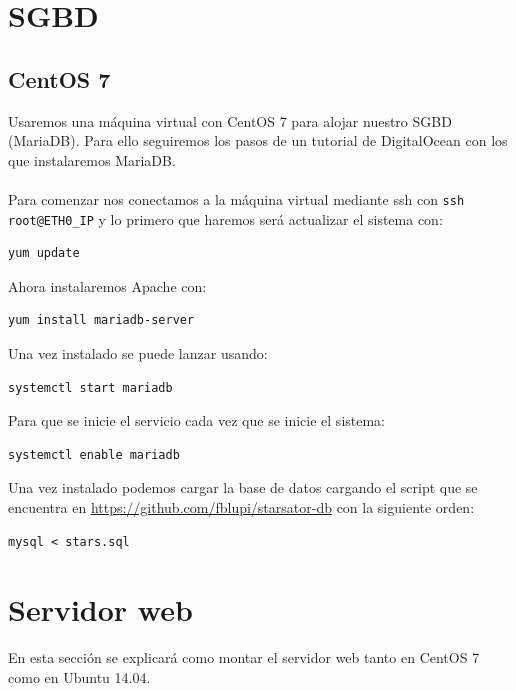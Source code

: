 \section{SGBD}

\subsection{CentOS 7}

Usaremos una máquina virtual con CentOS 7 para alojar nuestro SGBD (MariaDB). Para ello seguiremos los pasos de un tutorial de DigitalOcean \cite{InstallMariaDBCentos7} con los que instalaremos MariaDB.
\\ \\
Para comenzar nos conectamos a la máquina virtual mediante ssh con \texttt{ssh root@ETH0\_IP} y lo primero que haremos será actualizar el sistema con:

\begin{lstlisting}
yum update
\end{lstlisting}

Ahora instalaremos Apache con:

\begin{lstlisting}
yum install mariadb-server
\end{lstlisting}

Una vez instalado se puede lanzar usando:

\begin{lstlisting}
systemctl start mariadb
\end{lstlisting}

Para que se inicie el servicio cada vez que se inicie el sistema:

\begin{lstlisting}
systemctl enable mariadb
\end{lstlisting}

Una vez instalado podemos cargar la base de datos cargando el script que se encuentra en \url{https://github.com/fblupi/starsator-db} con la siguiente orden:

\begin{lstlisting}
mysql < stars.sql
\end{lstlisting}

\section{Servidor web}

En esta sección se explicará como montar el servidor web tanto en CentOS 7 como en Ubuntu 14.04.


